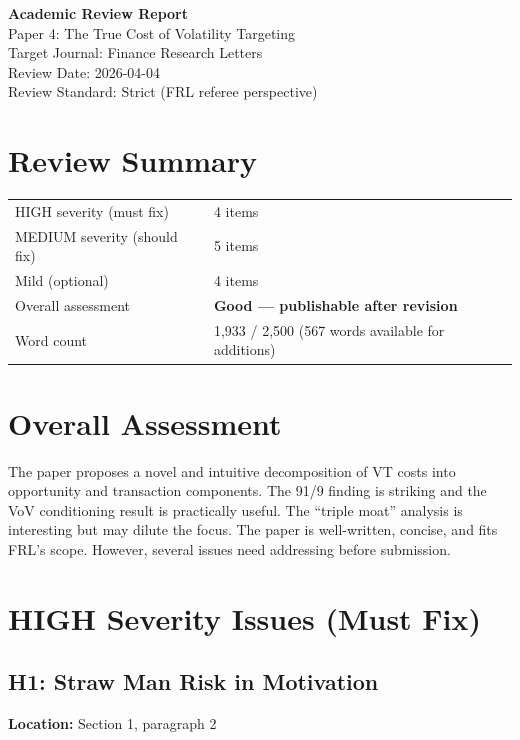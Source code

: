 \documentclass[12pt,a4paper]{article}
\begin{document}
\begin{center}
{\Large\bfseries Academic Review Report}\\[0.5em]
{\large Paper 4: The True Cost of Volatility Targeting}\\[0.5em]
{\normalsize Target Journal: Finance Research Letters}\\
{\normalsize Review Date: 2026-04-04}\\
{\normalsize Review Standard: Strict (FRL referee perspective)}
\end{center}

\section*{Review Summary}

\begin{tabular}{ll}
\textcolor{errorred}{HIGH severity (must fix)} & 4 items \\
\textcolor{warncolor}{MEDIUM severity (should fix)} & 5 items \\
Mild (optional) & 4 items \\
Overall assessment & \textbf{Good --- publishable after revision} \\
Word count & 1,933 / 2,500 (567 words available for additions)
\end{tabular}

\section*{Overall Assessment}

The paper proposes a novel and intuitive decomposition of VT costs into opportunity and transaction components. The 91/9 finding is striking and the VoV conditioning result is practically useful. The ``triple moat'' analysis is interesting but may dilute the focus. The paper is well-written, concise, and fits FRL's scope. However, several issues need addressing before submission.

\section*{\textcolor{errorred}{HIGH Severity Issues (Must Fix)}}

\subsection*{H1: Straw Man Risk in Motivation}

\textbf{Location:} Section 1, paragraph 2
\end{document}
